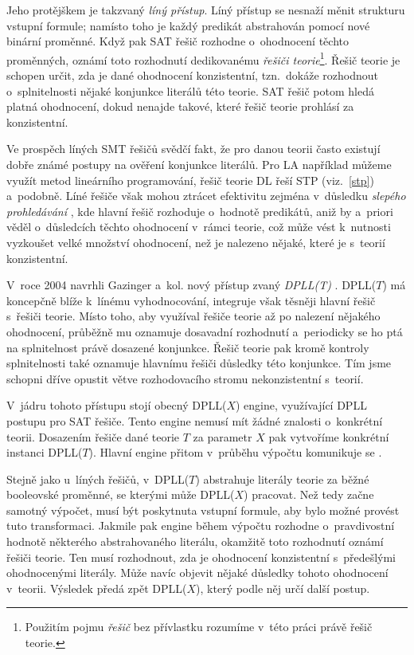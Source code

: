 Jeho protějškem je takzvaný \emph{líný přístup}. Líný přístup se nesnaží měnit strukturu vstupní formule; namísto toho je každý predikát abstrahován pomocí nové binární proměnné. Když pak SAT řešič rozhodne o~ohodnocení těchto proměnných, oznámí toto rozhodnutí dedikovanému \emph{řešiči teorie}\footnote{Použitím pojmu \emph{řešič} bez přívlastku rozumíme v~této práci právě řešič teorie.}. Řešič teorie je schopen určit, zda je dané ohodnocení konzistentní, tzn.~dokáže rozhodnout o~splnitelnosti nějaké konjunkce literálů této teorie. SAT řešič potom hledá platná ohodnocení, dokud nenajde takové, které řešič teorie prohlásí za konzistentní.

Ve prospěch líných SMT řešičů svědčí fakt, že pro danou teorii často existují dobře známé postupy na ověření konjunkce literálů. Pro LA například můžeme využít metod lineárního programování, řešič teorie DL řeší STP (viz.~\ref{stp}) a~podobně. Líné řešiče však mohou ztrácet efektivitu zejména v~důsledku \emph{slepého prohledávání} \cite{Moura04}, kde hlavní řešič rozhoduje o~hodnotě predikátů, aniž by a~priori věděl o~důsledcích těchto ohodnocení v~rámci teorie, což může vést k~nutnosti vyzkoušet velké množství ohodnocení, než je nalezeno nějaké, které je s~teorií konzistentní.

V~roce 2004 navrhli Gazinger a~kol. nový přístup zvaný \emph{DPLL(T)} \cite{Gazinger04}. DPLL($T$) má koncepčně blíže k~línému vyhodnocování, integruje však těsněji hlavní řešič s~řešiči teorie. Místo toho, aby využíval řešiče teorie až po nalezení nějakého ohodnocení, průběžně mu oznamuje dosavadní rozhodnutí a~periodicky se ho ptá na splnitelnost právě dosazené konjunkce. Řešič teorie pak kromě kontroly splnitelnosti také oznamuje hlavnímu řešiči důsledky této konjunkce. Tím jsme schopni dříve opustit větve rozhodovacího stromu nekonzistentní s~teorií. 

V~jádru tohoto přístupu stojí obecný DPLL($X$) engine, využívající DPLL \cite{Davis60} postupu pro SAT řešiče. Tento engine nemusí mít žádné znalosti o~konkrétní teorii. Dosazením řešiče \Solver dané teorie $T$ za parametr $X$ pak vytvoříme konkrétní instanci DPLL($T$). Hlavní engine přitom v~průběhu výpočtu komunikuje se \Solver.

Stejně jako u~líných řešičů, v~DPLL($T$) abstrahuje \Solver literály teorie za běžné booleovské proměnné, se kterými může DPLL($X$) pracovat. Než tedy začne samotný výpočet, musí být \Solver poskytnuta vstupní formule, aby bylo možné provést tuto transformaci. Jakmile pak engine během výpočtu rozhodne o~pravdivostní hodnotě některého abstrahovaného literálu, okamžitě toto rozhodnutí oznámí řešiči teorie. Ten musí rozhodnout, zda je ohodnocení konzistentní s~předešlými ohodnocenými literály. Může navíc objevit nějaké důsledky tohoto ohodnocení v~teorii. Výsledek \Solver předá zpět DPLL($X$), který podle něj určí další postup. 

